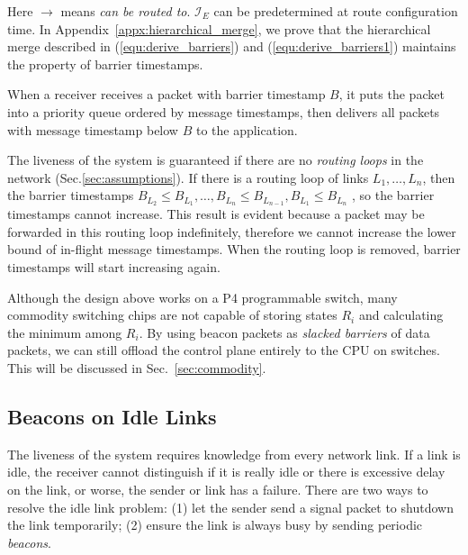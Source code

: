 Here $\rightarrow$ means \textit{can be routed to}.
$\mathcal{I}_E$ can be predetermined at route configuration time.
In Appendix~\ref{appx:hierarchical_merge}, we prove that the hierarchical merge described in (\ref{equ:derive_barriers}) and (\ref{equ:derive_barriers1}) maintains the property of barrier timestamps.

When a receiver receives a packet with barrier timestamp $B$, it puts the packet into a priority queue ordered by message timestamps, then delivers all packets with message timestamp below $B$ to the application.

{The liveness of the system is guaranteed if there are no \textit{routing loops} in the network (Sec.\ref{sec:assumptions}).}
If there is a routing loop of links $L_1, \ldots , L_n$, then the barrier timestamps $B_{L_2} \leq B_{L_1}, \ldots, B_{L_n} \leq B_{L_{n-1}}, B_{L_1} \leq B_{L_n}$
{, so the barrier timestamps cannot increase.
This result is evident because a packet may be forwarded in this routing loop indefinitely, therefore we cannot increase the lower bound of in-flight message timestamps.}
When the routing loop is removed, barrier timestamps will start increasing again.

Although the design above works on a P4 programmable switch, many commodity switching chips are not capable of storing states $R_i$ and calculating the minimum among $R_i$.
By using beacon packets as \textit{slacked barriers} of data packets, we can still offload the control plane entirely to the CPU on switches. This will be discussed in Sec.~\ref{sec:commodity}.

\subsection{Beacons on Idle Links}
\label{sec:beacon}

The liveness of the system requires knowledge from every network link. If a link is idle, the receiver cannot distinguish if it is really idle or there is excessive delay on the link, or worse, the sender or link has a failure. There are two ways to resolve the idle link problem: (1) let the sender send a signal packet to shutdown the link temporarily; (2) ensure the link is always busy by sending periodic \textit{beacons}.

